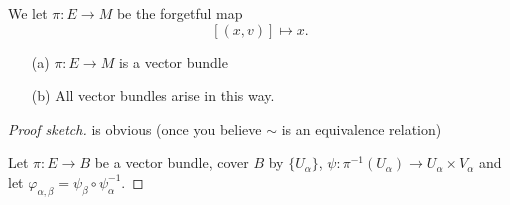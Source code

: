 We let \(\pi:E\to M\) be the forgetful map \[[(x,v)]\mapsto x.\]

\begin{lemma}\label{lem:8.3}
    \begin{enumerate}
        \item[(a)] \(\pi:E\to M\) is a vector bundle
        \item[(b)] All vector bundles arise in this way.  
    \end{enumerate}
\end{lemma}

\begin{proof}[Proof sketch]
     is obvious (once you believe \(\sim\) is an equivalence relation)

     Let \(\pi:E\to B\) be a vector bundle, cover 
    \(B\) by \(\{U_\alpha\}\), \(\psi:\pi^{-1}(U_\alpha)\to U_\alpha\times V_\alpha\) and let \(\varphi_{\alpha,\beta}=\psi_\beta\circ \psi_\alpha^{-1}\). \qedhere 
\end{proof}


